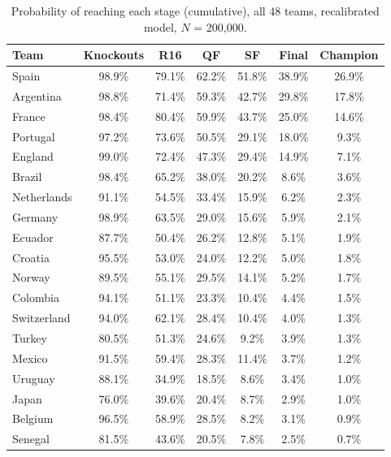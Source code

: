 \documentclass[11pt,letterpaper]{article}
\begin{document}
\begin{table}[p]
\centering\footnotesize
\caption{Probability of reaching each stage (cumulative), all 48 teams, recalibrated model, $N$ = 200{,}000.}
\label{tab:survival}
\begin{tabular}{lcccccc}
\toprule
Team & Knockouts & R16 & QF & SF & Final & Champion \\
\midrule
Spain                  & 98.9\% & 79.1\% & 62.2\% & 51.8\% & 38.9\% & 26.9\% \\
Argentina              & 98.8\% & 71.4\% & 59.3\% & 42.7\% & 29.8\% & 17.8\% \\
France                 & 98.4\% & 80.4\% & 59.9\% & 43.7\% & 25.0\% & 14.6\% \\
Portugal               & 97.2\% & 73.6\% & 50.5\% & 29.1\% & 18.0\% &  9.3\% \\
England                & 99.0\% & 72.4\% & 47.3\% & 29.4\% & 14.9\% &  7.1\% \\
Brazil                 & 98.4\% & 65.2\% & 38.0\% & 20.2\% &  8.6\% &  3.6\% \\
Netherlands            & 91.1\% & 54.5\% & 33.4\% & 15.9\% &  6.2\% &  2.3\% \\
Germany                & 98.9\% & 63.5\% & 29.0\% & 15.6\% &  5.9\% &  2.1\% \\
Ecuador                & 87.7\% & 50.4\% & 26.2\% & 12.8\% &  5.1\% &  1.9\% \\
Croatia                & 95.5\% & 53.0\% & 24.0\% & 12.2\% &  5.0\% &  1.8\% \\
Norway                 & 89.5\% & 55.1\% & 29.5\% & 14.1\% &  5.2\% &  1.7\% \\
Colombia               & 94.1\% & 51.1\% & 23.3\% & 10.4\% &  4.4\% &  1.5\% \\
Switzerland            & 94.0\% & 62.1\% & 28.4\% & 10.4\% &  4.0\% &  1.3\% \\
Turkey                 & 80.5\% & 51.3\% & 24.6\% &  9.2\% &  3.9\% &  1.3\% \\
Mexico                 & 91.5\% & 59.4\% & 28.3\% & 11.4\% &  3.7\% &  1.2\% \\
Uruguay                & 88.1\% & 34.9\% & 18.5\% &  8.6\% &  3.4\% &  1.0\% \\
Japan                  & 76.0\% & 39.6\% & 20.4\% &  8.7\% &  2.9\% &  1.0\% \\
Belgium                & 96.5\% & 58.9\% & 28.5\% &  8.2\% &  3.1\% &  0.9\% \\
Senegal                & 81.5\% & 43.6\% & 20.5\% &  7.8\% &  2.5\% &  0.7\% \\

\end{tabular}
\end{table}
\end{document}
